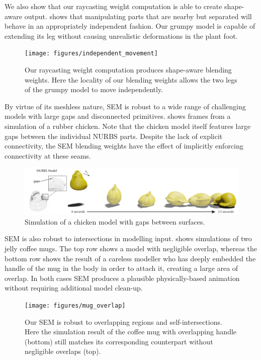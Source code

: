 We also show that our raycasting weight computation is able to create shape-aware output.  shows that manipulating
parts that are nearby but separated will behave in an appropriately independent fashion. Our grumpy model is capable of extending 
its leg without causing unrealistic deformations in the plant foot.

\begin{figure}[h]
  \texttt{[image: figures/independent\_movement]}
  \caption{Our raycasting weight computation produces shape-aware blending weights. Here the locality of our blending weights allows the two legs of the grumpy model to move independently. }
  \label{fig:independence}
\end{figure}

By virtue of its meshless nature, SEM is robust to a wide range of challenging models with large gaps and disconnected primitives.
 shows frames from a simulation of a rubber chicken. Note that the chicken model itself features large gaps between the individual NURBS parts. 
Despite the lack of explicit connectivity, the SEM blending weights have the effect of implicitly enforcing connectivity at these seams. 

\begin{figure}[htp]
  \includegraphics[width=\textwidth]{figures/chicken.pdf}
  \caption{Simulation of a chicken model with gaps between surfaces.}
  \label{fig:chicken}
\end{figure}

SEM is also robust to intersections in modelling input.  shows simulations of two jelly coffee mugs. 
The top row shows a model with negligible overlap, whereas the bottom row shows the result of a careless modeller who has deeply embedded the handle of the mug in the body in order to attach it, creating a large area of overlap.
In both cases SEM produces a plausible physically-based animation without requiring additional model clean-up.

\begin{figure}[h]
  \texttt{[image: figures/mug\_overlap]}
  \caption{Our SEM is robust to overlapping regions and self-intersections. Here the simulation result of the coffee mug with overlapping handle (bottom) still matches its corresponding counterpart without negligible overlaps (top). }
  \label{fig:badmodels}
\end{figure}

